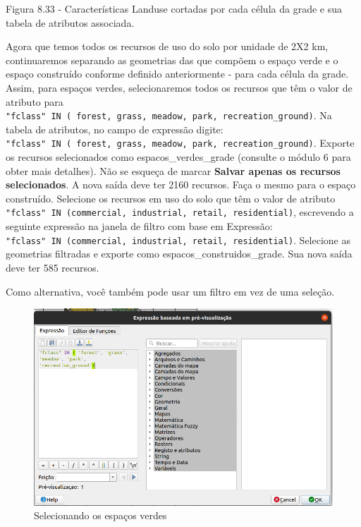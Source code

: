 \documentclass[
  portuguese,
]{krantz}
\begin{document}
Figura 8.33 - Características Landuse cortadas por cada célula da grade e sua tabela de atributos associada.

Agora que temos todos os recursos de uso do solo por unidade de 2X2 km, continuaremos separando as geometrias das que compõem o espaço verde e o espaço construído conforme definido anteriormente - para cada célula da grade. Assim, para espaços verdes, selecionaremos todos os recursos que têm o valor de atributo para \texttt{"fclass"\ IN\ (\ \textquotesingle{}forest\textquotesingle{},\ \textquotesingle{}grass\textquotesingle{},\ \textquotesingle{}meadow\textquotesingle{},\ \textquotesingle{}park\textquotesingle{},\ \textquotesingle{}recreation\_ground\textquotesingle{})}. Na tabela de atributos, no campo de expressão digite: \texttt{"fclass"\ IN\ (\ \textquotesingle{}forest\textquotesingle{},\ \textquotesingle{}grass\textquotesingle{},\ \textquotesingle{}meadow\textquotesingle{},\ \textquotesingle{}park\textquotesingle{},\ \textquotesingle{}recreation\_ground\textquotesingle{})}. Exporte os recursos selecionados como espacos\_verdes\_grade (consulte o módulo 6 para obter mais detalhes). Não se esqueça de marcar \textbf{Salvar apenas os recursos selecionados}. A nova saída deve ter 2160 recursos. Faça o mesmo para o espaço construído. Selecione os recursos em uso do solo que têm o valor de atributo \texttt{"fclass"\ IN\ (\textquotesingle{}commercial\textquotesingle{},\ \textquotesingle{}industrial\textquotesingle{},\ \textquotesingle{}retail\textquotesingle{},\ \textquotesingle{}residential\textquotesingle{})}, escrevendo a seguinte expressão na janela de filtro com base em Expressão: \texttt{"fclass"\ IN\ (\textquotesingle{}commercial\textquotesingle{},\ \textquotesingle{}industrial\textquotesingle{},\ \textquotesingle{}retail\textquotesingle{},\ \textquotesingle{}residential\textquotesingle{})}. Selecione as geometrias filtradas e exporte como espacos\_construidos\_grade. Sua nova saída deve ter 585 recursos.

Como alternativa, você também pode usar um filtro em vez de uma seleção.

\begin{figure}
\centering
\includegraphics{media/modulo8/fig834_a.png}
\caption{Selecionando os espaços verdes}
\end{figure}
\end{document}
